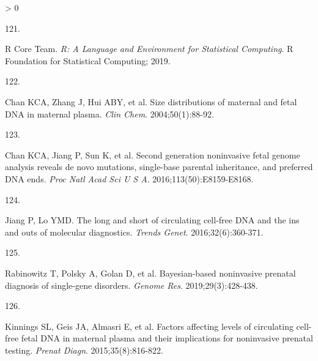 \documentclass[11pt,letterpaper,oneside]{book}
\newlength{\cslhangindent}
\newlength{\csllabelwidth}
\newenvironment{CSLReferences}[3] %
 {%
  \setlength{\parindent}{0pt}
  \ifodd #1 \everypar{\setlength{\hangindent}{\cslhangindent}}\ignorespaces\fi
  \ifnum #2 > 0
  \setlength{\parskip}{#2\baselineskip}
  \fi
 }%
 {}
\newcommand{\CSLLeftMargin}[1]{\parbox[t]{\maxof{\widthof{#1}}{\csllabelwidth}}{#1}}
\newcommand{\CSLRightInline}[1]{\parbox[t]{\linewidth-\csllabelwidth}{#1}\newline}
\begin{document}
\begin{CSLReferences}{0}{0}
\leavevmode\hypertarget{ref-r-core-team:2019aa}{}%
\CSLLeftMargin{121. }
\CSLRightInline{R Core Team. \emph{R: A Language and Environment for Statistical Computing}. R Foundation for Statistical Computing; 2019.}

\leavevmode\hypertarget{ref-chan:2004aa}{}%
\CSLLeftMargin{122. }
\CSLRightInline{Chan KCA, Zhang J, Hui ABY, et al. Size distributions of maternal and fetal DNA in maternal plasma. \emph{Clin Chem}. 2004;50(1):88-92.}

\leavevmode\hypertarget{ref-chan:2016aa}{}%
\CSLLeftMargin{123. }
\CSLRightInline{Chan KCA, Jiang P, Sun K, et al. Second generation noninvasive fetal genome analysis reveals de novo mutations, single-base parental inheritance, and preferred DNA ends. \emph{Proc Natl Acad Sci U S A}. 2016;113(50):E8159-E8168.}

\leavevmode\hypertarget{ref-jiang:2016ab}{}%
\CSLLeftMargin{124. }
\CSLRightInline{Jiang P, Lo YMD. The long and short of circulating cell-free DNA and the ins and outs of molecular diagnostics. \emph{Trends Genet}. 2016;32(6):360-371.}

\leavevmode\hypertarget{ref-rabinowitz:2019aa}{}%
\CSLLeftMargin{125. }
\CSLRightInline{Rabinowitz T, Polsky A, Golan D, et al. Bayesian-based noninvasive prenatal diagnosis of single-gene disorders. \emph{Genome Res}. 2019;29(3):428-438.}

\leavevmode\hypertarget{ref-kinnings:2015aa}{}%
\CSLLeftMargin{126. }
\CSLRightInline{Kinnings SL, Geis JA, Almasri E, et al. Factors affecting levels of circulating cell-free fetal DNA in maternal plasma and their implications for noninvasive prenatal testing. \emph{Prenat Diagn}. 2015;35(8):816-822.}

\end{CSLReferences}
\end{document}

